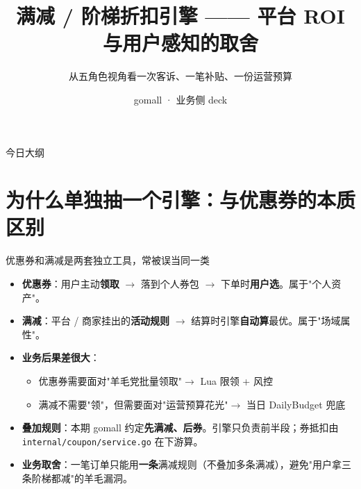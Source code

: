 \documentclass[aspectratio=169,11pt]{beamer}
\title{满减 / 阶梯折扣引擎 —— 平台 ROI 与用户感知的取舍}
\subtitle{从五角色视角看一次客诉、一笔补贴、一份运营预算}
\author{gomall · 业务侧 deck}
\date{}
\begin{document}
\maketitle

\begin{frame}[shrink]{今日大纲}
\tableofcontents
\end{frame}

\section{为什么单独抽一个引擎：与优惠券的本质区别}

\begin{frame}[shrink]{优惠券和满减是两套独立工具，常被误当同一类}
\begin{itemize}
  \item \textbf{优惠券}：用户主动\textbf{领取} $\to$ 落到个人券包 $\to$ 下单时\textbf{用户选}。属于"个人资产"。
  \item \textbf{满减}：平台 / 商家挂出的\textbf{活动规则} $\to$ 结算时引擎\textbf{自动算}最优。属于"场域属性"。
  \item \textbf{业务后果差很大}：
  \begin{itemize}
    \item 优惠券需要面对"羊毛党批量领取"$\to$ Lua 限领 + 风控
    \item 满减不需要"领"，但需要面对"运营预算花光"$\to$ 当日 DailyBudget 兜底
  \end{itemize}
  \item \textbf{叠加规则}：本期 gomall 约定\textbf{先满减、后券}。引擎只负责前半段；券抵扣由 \texttt{internal/coupon/service.go} 在下游算。
  \item \textbf{业务取舍}：一笔订单只能用\textbf{一条}满减规则（不叠加多条满减），避免"用户拿三条阶梯都减"的羊毛漏洞。
\end{itemize}
\end{frame}
\end{document}
